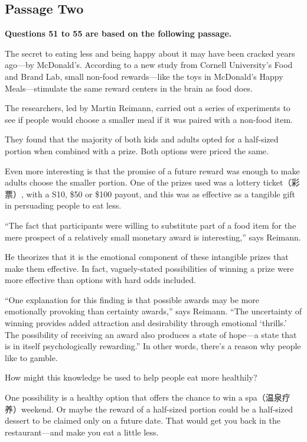 \documentclass[UTF8,11pt]{ctexart}
\begin{document}
\subsection*{\textbf{Passage Two}}


\textbf{Questions 51 to 55 are based on the following passage.}


The secret to eating less and being happy about it may have been cracked years ago—by McDonald’s. According to a new study from Cornell University’s Food and Brand Lab, small non-food rewards—like the toys in McDonald’s Happy Meals—stimulate the same reward centers in the brain as food does.


The researchers, led by Martin Reimann, carried out a series of experiments to see if people would choose a smaller meal if it was paired with a non-food item.


They found that the majority of both kids and adults opted for a half-sized portion when combined with a prize. Both options were priced the same.


Even more interesting is that the promise of a future reward was enough to make adults choose the smaller portion. One of the prizes used was a lottery ticket（彩票）, with a S10, \$50 or \$100 payout, and this was as effective as a tangible gift in persuading people to eat less.


“The fact that participants were willing to substitute part of a food item for the mere prospect of a relatively small monetary award is interesting,” says Reimann.


He theorizes that it is the emotional component of these intangible prizes that make them effective. In fact, vaguely-stated possibilities of winning a prize were more effective than options with hard odds included.


“One explanation for this finding is that possible awards may be more emotionally provoking than certainty awards,” says Reimann. “The uncertainty of winning provides added attraction and desirability through emotional ‘thrills.’ The possibility of receiving an award also produces a state of hope—a state that is in itself psychologically rewarding.” In other words, there’s a reason why people like to gamble.


How might this knowledge be used to help people eat more healthily?


One possibility is a healthy option that offers the chance to win a spa（温泉疗养）weekend. Or maybe the reward of a half-sized portion could be a half-sized dessert to be claimed only on a future date. That would get you back in the restaurant—and make you eat a little less.
\end{document}
